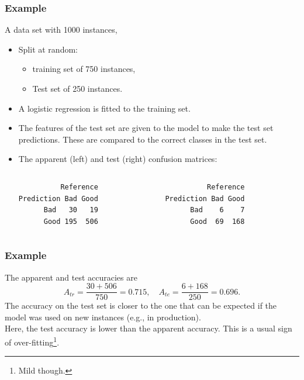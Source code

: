 \begin{frame}[fragile]
\frametitle{Example}
A data set with 1000 instances,
\begin{itemize}
\item Split at random: 
\begin{itemize}
\item training set of 750 instances,
\item Test set of 250 instances. 
\end{itemize}
\item A logistic regression is fitted to the training set. 
\item The features of the test set are given to the model to make the test set predictions. These are compared to the correct classes in the test set. 
\item The apparent (left) and test (right) confusion matrices:\\
\scriptsize
\begin{columns}
\begin{column}{0.5\textwidth}
\begin{verbatim}
          Reference
Prediction Bad Good
      Bad   30   19
      Good 195  506
\end{verbatim}
\end{column}
\begin{column}{0.5\textwidth}
\begin{verbatim}
          Reference
Prediction Bad Good
      Bad    6    7
      Good  69  168
\end{verbatim}
\end{column}
\end{columns}
\normalsize
\end{itemize}
\end{frame}
\begin{frame}
\frametitle{Example}
The apparent and test accuracies are
$$
A_{tr} = \frac{30+506}{750} = 0.715, \quad
A_{te} = \frac{6+168}{250} = 0.696.
$$
The accuracy on the test set is closer to the one that can be expected if the model was used on new instances (e.g., in production).\\
\vspace{0.3cm}
Here, the test accuracy is lower than the apparent accuracy. This is a usual sign of over-fitting\footnote{Mild though.}.
\end{frame}
